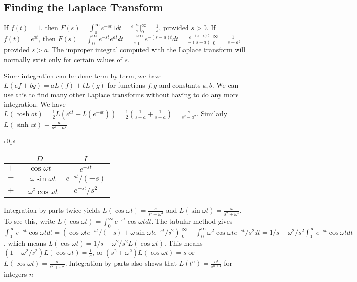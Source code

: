 \subsection{Finding the Laplace Transform}
If $f(t)=1$, then $F(s)=\int_0^\infty e^{-st}1dt= \frac{e^{-st}}{-s}\big|_0^\infty = \frac{1}{s}$, provided $s>0$. If $f(t)=e^{at}$, then $F(s)=\int_0^\infty e^{-st}e^{at}dt=\int_0^\infty e^{-(s-a)t}dt= \frac{e^{-(s-a)t}}{-(s-a)}\big|_0^\infty = \frac{1}{s-a}$, provided $s>a$. The improper integral computed with the Laplace transform will normally exist only for certain values of $s$. 

Since integration can be done term by term, we have $L(af+bg)=aL(f)+bL(g)$ for functions $f,g$ and constants $a,b$.  We can use this to find many other Laplace transforms without having to do any more integration. We have $L(\cosh a t) = \frac{1}{2}L(e^{at}+L(e^{-a t}))=\frac{1}{2}\left(\frac{1}{s-a}+\frac{1}{s+a}\right) = \frac{s}{s^2-a^2}$. Similarly $L(\sinh a t) = \frac{a}{s^2-a^2}$.  

\begin{wraptable}[5]{r}{0pt}
\begin{tabular}{|c|c|c|}
\hline
&$D$&$I$\\\hline
$+$&$\cos \omega t$&$e^{-st}$\\
$-$&$-\omega \sin \omega t$&$e^{-st}/(-s)$\\
$+$&$-\omega^2 \cos \omega t$&$e^{-st}/s^2$\\\hline
\end{tabular}
\end{wraptable}

Integration by parts twice yields $L(\cos \omega t) = \frac{s}{s^2+\omega^2}$ and $L(\sin \omega t) = \frac{\omega}{s^2+\omega^2}$. To see this, write $L(\cos \omega t) = \int_0^\infty e^{-st}\cos \omega t dt$.  The tabular method gives $\int_0^\infty e^{-st}\cos \omega t dt = \left(\cos \omega t e^{-st}/(-s) +\omega \sin \omega te^{-st}/s^2\right)\big|_0^\infty - \int_0^\infty \omega^2 \cos \omega te^{-st}/s^2dt = 1/s - \omega^2/s^2 \int_0^\infty e^{-st}\cos \omega t dt$, which means $L(\cos \omega t) = 1/s-\omega^2/s^2L(\cos \omega t)$. This means $(1+\omega^2/s^2)L(\cos \omega t) = \frac{1}{s}$, or $(s^2+\omega^2) L(\cos \omega t)=s$ or $L(\cos \omega t)=\frac{s}{s^2+\omega^2}$. Integration by parts also shows that $L(t^n) = \frac{n!}{s^{n+1}}$ for integers $n$. 

%

